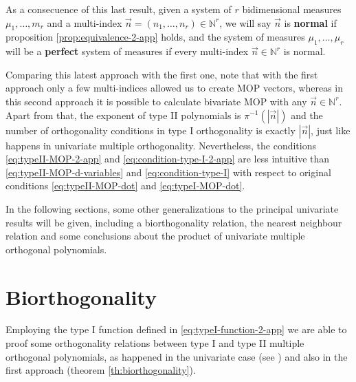 \documentclass[12pt,a4]{report}
\theoremstyle{plain}
\newcommand{\N}[0]{\mathbb{N}}
\begin{document}
  As a consecuence of this last result, given a system of $r$ bidimensional measures $\mu_1,\dots,m_r$ and a multi-index $\vec n=(n_1,\dots,n_r)\in\N^r$, we will say $\vec n$ is \textbf{normal} if proposition \ref{prop:equivalence-2-app} holds, and the system of measures $\mu_1,\dots,\mu_r$ will be a \textbf{perfect} system of measures if every multi-index $\vec n\in\N^r$ is normal. 
  
  Comparing this latest approach with the first one, note that with the first approach only a few multi-indices allowed us to create MOP vectors, whereas in this second approach it is possible to calculate bivariate MOP with any $\vec n\in\N^r$. Apart from that, the exponent of type II polynomials is $\pi^{-1}(|\vec n|)$ and the number of orthogonality conditions in type I orthogonality is exactly $|\vec n|$, just like happens in univariate multiple orthogonality. Nevertheless, the conditions \eqref{eq:typeII-MOP-2-app} and \eqref{eq:condition-type-I-2-app} are less intuitive than \eqref{eq:typeII-MOP-d-variables} and \eqref{eq:condition-type-I} with respect to original conditions \eqref{eq:typeII-MOP-dot} and \eqref{eq:typeI-MOP-dot}.

    In the following sections, some other generalizations to the principal univariate results will be given, including a biorthogonality relation, the nearest neighbour relation and some conclusions about the product of univariate multiple orthogonal polynomials.


    \section{Biorthogonality}

    Employing the type I function defined in \eqref{eq:typeI-function-2-app} we are able to proof some orthogonality relations between type I and type II multiple orthogonal polynomials, as happened in the univariate case (see \cite[Theorem 23.1.6]{Ismail}) and also in the first approach (theorem \ref{th:biorthogonality}). 
\end{document}
